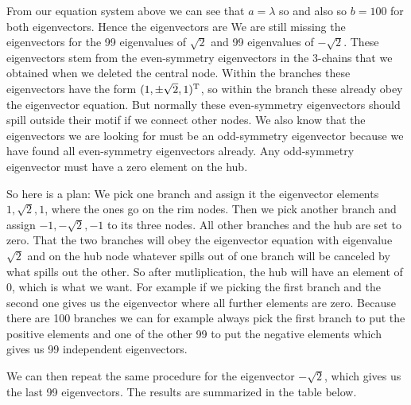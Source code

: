 From our equation system above we can see that $a=\lambda$ so 
and also
so $b=100$ for both eigenvectors. Hence the eigenvectors are 
We are still missing the eigenvectors for the 99 eigenvalues of $\sqrt{2}$ and 99 eigenvalues of $-\sqrt{2}$. These eigenvectors stem from the even-symmetry eigenvectors in the 3-chains that we obtained when we deleted the central node.
Within the branches these eigenvectors have the form $(1,\pm \sqrt{2},1)^{\rm T}$, so within the branch these already obey the eigenvector equation. But normally these even-symmetry eigenvectors should spill outside their motif if we connect other nodes. We also know that the eigenvectors we are looking for must be an odd-symmetry eigenvector because we have found all even-symmetry eigenvectors already. Any odd-symmetry eigenvector must have a zero element on the hub.

So here is a plan: We pick one branch and assign it the eigenvector elements $1,\sqrt{2},1$, where the ones go on the rim nodes. Then we pick another branch and assign $-1,-\sqrt{2},-1$ to its three nodes. All other branches and the hub are set to zero. That the two branches will obey the eigenvector equation with eigenvalue $\sqrt{2}$ and on the hub node whatever spills out of one branch will be canceled by what spills out the other. So after mutliplication, the hub will have an element of 0, which is what we want. For example if we picking the first branch and the second one gives us the eigenvector 
where all further elements are zero. Because there are 100 branches we can for example always pick the first branch to put the positive elements and one of the other 99 to put the negative elements which gives us 99 independent eigenvectors. 

We can then repeat the same procedure for the eigenvector $-\sqrt{2}$, which gives us the last 99 eigenvectors. The results are summarized in the table below. 

\makeatletter

